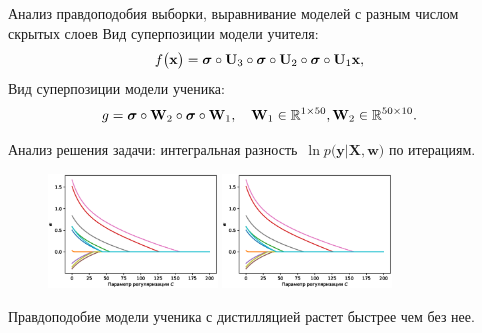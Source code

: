 \documentclass[10pt,pdf,hyperref={unicode}]{beamer}
\begin{document}
\begin{frame}{Анализ правдоподобия выборки, выравнивание моделей с разным числом скрытых слоев}
\justifying
Вид суперпозиции модели учителя:
$$
\setlength\abovedisplayskip{0pt}
f\bigr(\mathbf{x}\bigr) = \bm{\sigma} \circ \mathbf{U}_3\circ \bm{\sigma} \circ \mathbf{U}_2\circ\bm{\sigma}\circ \mathbf{U}_1\mathbf{x},
\setlength\belowdisplayskip{0pt}
$$
Вид суперпозиции модели ученика:
$$
\setlength\abovedisplayskip{0pt}
g = \bm{\sigma} \circ \mathbf{W}_2 \circ \bm{\sigma} \circ \mathbf{W}_1, \quad \mathbf{W}_{1} \in \mathbb{R}^{1 \times 50}, \mathbf{W}_{2} \in \mathbb{R}^{50 \times 10}.
\setlength\belowdisplayskip{0pt}
$$
\begin{table}[]
\begin{center}
\end{center}
\end{table}

Анализ решения задачи: интегральная разность~$\ln p\bigr(\mathbf{y}|\mathbf{X}, \mathbf{w}\bigr)$ по итерациям.
\begin{figure}[h!]
\includegraphics[width=0.4\textwidth]{../figures/log_reg_cs_exp.eps}
\includegraphics[width=0.4\textwidth]{../figures/log_reg_cs_exp.eps}
\end{figure}

Правдоподобие модели ученика с дистилляцией растет быстрее чем без нее.

\end{frame}
\end{document}
